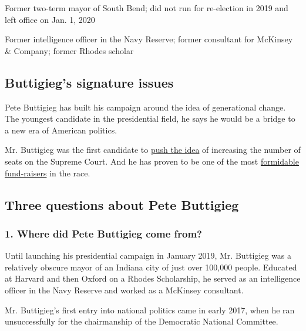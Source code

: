 Former two-term mayor of South Bend; did not run for re-election in 2019
and left office on Jan. 1, 2020

Former intelligence officer in the Navy Reserve; former consultant for
McKinsey \& Company; former Rhodes scholar

\hypertarget{buttigiegs-signature-issues}{%
\subsection{Buttigieg's signature
issues}\label{buttigiegs-signature-issues}}

Pete Buttigieg has built his campaign around the idea of generational
change. The youngest candidate in the presidential field, he says he
would be a bridge to a new era of American politics.

Mr. Buttigieg was the first candidate to
\href{https://www.nytimes.com/2019/03/12/us/politics/reparations-court-packing-filibuster-2020-democrats.html}{push
the idea} of increasing the number of seats on the Supreme Court. And he
has proven to be one of the most
\href{https://www.nytimes.com/2019/07/01/us/politics/pete-buttigieg-fundraising.html}{formidable
fund-raisers} in the race.

\hypertarget{three-questions-about-pete-buttigieg}{%
\subsection{Three questions about Pete
Buttigieg}\label{three-questions-about-pete-buttigieg}}

\hypertarget{1-where-did-pete-buttigieg-come-from}{%
\subsubsection{\texorpdfstring{\textbf{1. Where did Pete Buttigieg come
from?}}{1. Where did Pete Buttigieg come from?}}\label{1-where-did-pete-buttigieg-come-from}}

Until launching his presidential campaign in January 2019, Mr. Buttigieg
was a relatively obscure mayor of an Indiana city of just over 100,000
people. Educated at Harvard and then Oxford on a Rhodes Scholarship, he
served as an intelligence officer in the Navy Reserve and worked as a
McKinsey consultant.

Mr. Buttigieg's first entry into national politics came in early 2017,
when he ran unsuccessfully for the chairmanship of the Democratic
National Committee.

